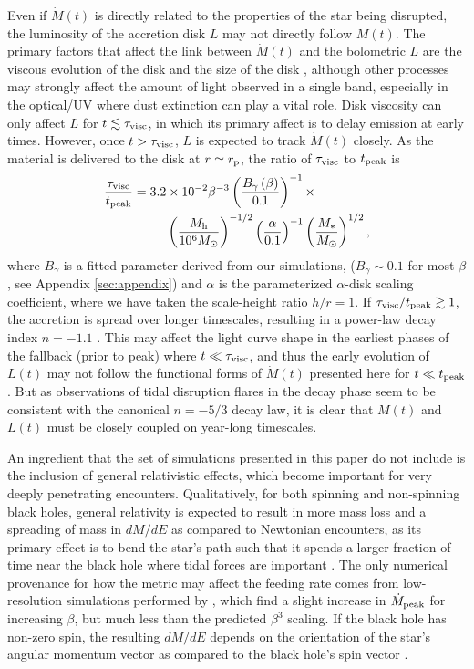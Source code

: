 \documentclass[twocolumn]{emulateapj}
\newcommand{\dmde}{dM/dE}
\newcommand{\md}{\dot{M}\left(t\right)}
\newcommand{\mdpeak}{\dot{M}_{\rm peak}}
\newcommand{\tpeak}{t_{\rm peak}}
\newcommand{\mh}{M_{\rm h}}
\newcommand{\msun}{M_{\odot}}
\begin{document}
Even if $\md$ is directly related to the properties of the star being disrupted, the luminosity of the accretion disk $L$ may not directly follow $\md$. The primary factors that affect the link between $\md$ and the bolometric $L$ are the viscous evolution of the disk and the size of the disk \citep{RamirezRuiz:2009gw}, although other processes may strongly affect the amount of light observed in a single band, especially in the optical/UV where dust extinction can play a vital role. Disk viscosity can only affect $L$ for $t \lesssim \tau_{\rm visc}$, in which its primary affect is to delay emission at early times. However, once $t > \tau_{\rm visc}$, $L$ is expected to track $\md$ closely. As the material is delivered to the disk at $r \simeq r_{\rm p}$, the ratio of $\tau_{\rm visc}$ to $\tpeak$ is
\begin{align}
\frac{\tau_{\rm visc}}{\tpeak} = 3.2 &\times 10^{-2} \beta^{-3} \left(\frac{B_\gamma\left(\beta\right)}{0.1}\right)^{-1} \times\nonumber\\
&\left(\frac{\mh}{10^{6} \msun}\right)^{-1/2}
\left(\frac{\alpha}{0.1}\right)^{-1} \left(\frac{M_\ast}{M_\odot}\right)^{1/2},
\end{align}
where $B_\gamma$ is a fitted parameter derived from our simulations, ($B_\gamma \sim 0.1$ for most $\beta$, see Appendix \ref{sec:appendix}) and $\alpha$ is the parameterized $\alpha$-disk scaling coefficient, where we have taken the scale-height ratio $h/r = 1$. If $\tau_{\rm visc}/t_{\rm peak} \gtrsim 1$, the accretion is spread over longer timescales, resulting in a power-law decay index $n = -1.1$ \citep{Cannizzo:1990hw}. This may affect the light curve shape in the earliest phases of the fallback (prior to peak) where $t \ll \tau_{\rm visc}$, and thus the early evolution of $L(t)$ may not follow the functional forms of $\md$ presented here for $t \ll t_{\rm peak}$. But as observations of tidal disruption flares in the decay phase seem to be consistent with the canonical $n = -5/3$ decay law, it is clear that $\md$ and $L(t)$ must be closely coupled on year-long timescales.

An ingredient that the set of simulations presented in this paper do not include is the inclusion of general relativistic effects, which become important for very deeply penetrating encounters. Qualitatively, for both spinning and non-spinning black holes, general relativity is expected to result in more mass loss and a spreading of mass in $\dmde$ as compared to Newtonian encounters, as its primary effect is to bend the star's path such that it spends a larger fraction of time near the black hole where tidal forces are important \citep{Luminet:1985wz,Kobayashi:2004kq}. The only numerical provenance for how the metric may affect the feeding rate comes from low-resolution simulations performed by \cite{Laguna:1993cf}, which find a slight increase in $\mdpeak$ for increasing $\beta$, but much less than the predicted $\beta^{3}$ scaling. If the black hole has non-zero spin, the resulting $\dmde$ depends on the orientation of the star's angular momentum vector as compared to the black hole's spin vector \citep{Haas:2012ci}.
\end{document}
